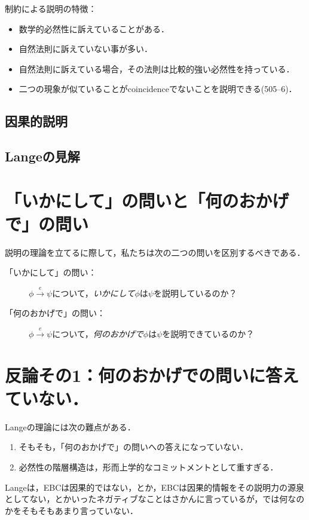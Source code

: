 \documentclass[twoside,11pt,uplatex]{jsarticle}
\theoremstyle{definition}
\begin{document}
制約による説明の特徴\cite{Lange2013a}：
\begin{itemize}
    \item 数学的必然性に訴えていることがある．
    \item 自然法則に訴えていない事が多い．
    \item 自然法則に訴えている場合，その法則は比較的強い必然性を持っている．
    \item 二つの現象が似ていることがcoincidenceでないことを説明できる(505--6)．
\end{itemize}
\subsection{因果的説明}
\subsection{Langeの見解}

\section{「いかにして」の問いと「何のおかげで」の問い}\label{howandwhat}
説明の理論を立てるに際して，私たちは次の二つの問いを区別するべきである．
	\begin{description}
	\item[「いかにして」の問い：]$\phi\xrightarrow{e}\psi$について，\emph{いかにして}$\phi$は$\psi$を説明しているのか？
	\item[「何のおかげで」の問い：]$\phi\xrightarrow{e}\psi$について，\emph{何のおかげで}$\phi$は$\psi$を説明できているのか？
	\end{description}


\section{反論その1：何のおかげでの問いに答えていない．}\label{firstargument}

Langeの理論には次の難点がある．
    \begin{enumerate}
    \item そもそも，「何のおかげで」の問いへの答えになっていない．
    \item 必然性の階層構造は，形而上学的なコミットメントとして重すぎる．
    \end{enumerate}

Langeは，EBCは因果的ではない，とか，EBCは因果的情報をその説明力の源泉としてない，とかいったネガティブなことはさかんに言っている\citep{Lange2013a}が，では何なのかをそもそもあまり言っていない．
\end{document}
